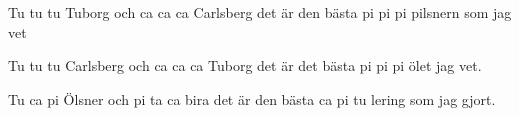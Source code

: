 	
\beginverse*						
Tu tu tu Tuborg 
och ca ca ca Carlsberg 
det är den bästa 
pi pi pi pilsnern som jag vet 
\endverse						

\beginverse				
Tu tu tu Carlsberg 
och ca ca ca Tuborg 
det är det bästa 
pi pi pi ölet jag vet. 
\endverse

\beginverse
Tu ca pi Ölsner och 
pi ta ca bira 
det är den bästa 
ca pi tu lering som jag gjort.
\endverse
\endsong		
